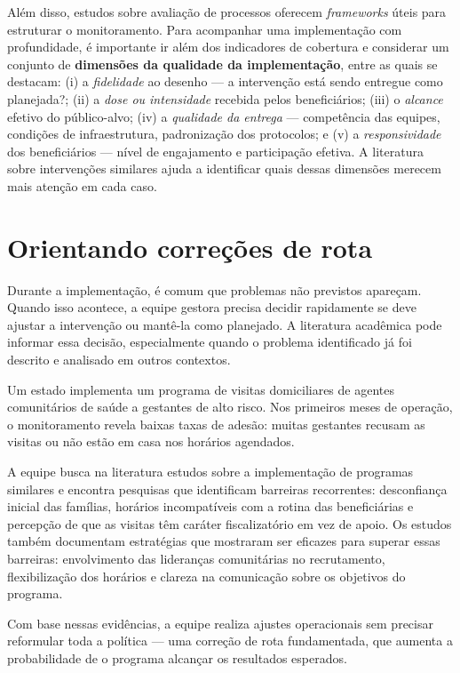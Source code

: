 \documentclass[12pt, a4paper, openany]{book}
\begin{document}
Além disso, estudos sobre avaliação de processos oferecem \textit{frameworks}
úteis para estruturar o monitoramento. Para acompanhar uma implementação com
profundidade, é importante ir além dos indicadores de cobertura e considerar
um conjunto de \textbf{dimensões da qualidade da implementação}, entre as
quais se destacam: (i) a \textit{fidelidade} ao desenho --- a intervenção
está sendo entregue como planejada?; (ii) a \textit{dose ou intensidade}
recebida pelos beneficiários; (iii) o \textit{alcance} efetivo do
público-alvo; (iv) a \textit{qualidade da entrega} --- competência das
equipes, condições de infraestrutura, padronização dos protocolos; e (v) a
\textit{responsividade} dos beneficiários --- nível de engajamento e
participação efetiva. A literatura sobre intervenções similares ajuda a
identificar quais dessas dimensões merecem mais atenção em cada caso.

\section{Orientando correções de rota}

Durante a implementação, é comum que problemas não previstos apareçam.
Quando isso acontece, a equipe gestora precisa decidir rapidamente se deve
ajustar a intervenção ou mantê-la como planejado. A literatura acadêmica pode
informar essa decisão, especialmente quando o problema identificado já foi
descrito e analisado em outros contextos.

\begin{exemplobox}
Um estado implementa um programa de visitas domiciliares de agentes
comunitários de saúde a gestantes de alto risco. Nos primeiros meses de
operação, o monitoramento revela baixas taxas de adesão: muitas gestantes
recusam as visitas ou não estão em casa nos horários agendados.

A equipe busca na literatura estudos sobre a implementação de programas
similares e encontra pesquisas que identificam barreiras recorrentes:
desconfiança inicial das famílias, horários incompatíveis com a rotina das
beneficiárias e percepção de que as visitas têm caráter fiscalizatório em
vez de apoio. Os estudos também documentam estratégias que mostraram ser
eficazes para superar essas barreiras: envolvimento das lideranças
comunitárias no recrutamento, flexibilização dos horários e clareza na
comunicação sobre os objetivos do programa.

Com base nessas evidências, a equipe realiza ajustes operacionais sem
precisar reformular toda a política --- uma correção de rota fundamentada,
que aumenta a probabilidade de o programa alcançar os resultados esperados.
\end{exemplobox}
\end{document}
